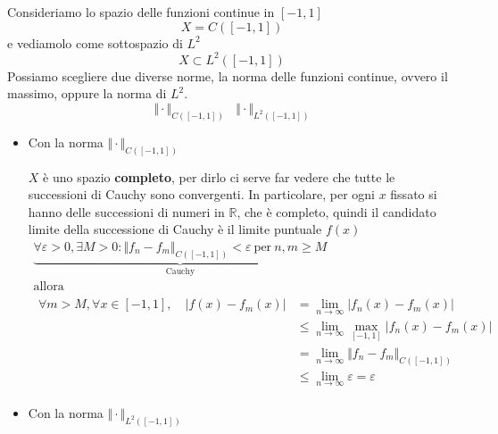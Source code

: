 Consideriamo lo spazio delle funzioni continue in $\displaystyle [ -1,1]$
\begin{equation*}
    X=C([ -1,1])
\end{equation*}
e vediamolo come sottospazio di $\displaystyle L^{2}$
\begin{equation*}
    X\subset L^{2}([ -1,1])
\end{equation*}
Possiamo scegliere due diverse norme, la norma delle funzioni continue, ovvero il massimo, oppure la norma di $\displaystyle L^{2}$.
\begin{equation*}
    \Vert \cdotp \Vert _{C([ -1,1])} \ \ \ \ \Vert \cdotp \Vert _{L^{2}([ -1,1])}
\end{equation*}
\begin{itemize}
    \item Con la norma $\displaystyle \Vert \cdotp \Vert _{C([ -1,1])}$

          $X$ è uno spazio \textbf{completo}, per dirlo ci serve far vedere che tutte le successioni di Cauchy sono convergenti. In particolare, per ogni $x$ fissato si hanno delle successioni di numeri in $\displaystyle \mathbb{R}$, che è completo, quindi il candidato limite della successione di Cauchy è il limite puntuale $\displaystyle f(x)$
          \begin{gather*}
              \underbrace{\forall \varepsilon  >0,\exists M >0:\Vert f_{n} -f_{m}\Vert _{C([ -1,1])} < \varepsilon \ \text{per} \ n,m\geq M}_{\text{Cauchy}}\\
              \text{allora}\\
              \begin{aligned}
                  \forall m >M,\forall x\in [ -1,1],\quad |f(x) -f_{m}(x) | & =\lim _{n\rightarrow \infty } |f_{n}(x) -f_{m}(x) |                        \\
                                                                            & \leq \lim _{n\rightarrow \infty }\max_{[ -1,1]} |f_{n}(x) -f_{m}(x) | \\
                                                                            & =\lim _{n\rightarrow \infty }\Vert f_{n} -f_{m}\Vert _{C([ -1,1])}         \\
                                                                            & \leq \lim _{n\rightarrow \infty } \varepsilon =\varepsilon
              \end{aligned}
          \end{gather*}
    \item Con la norma $\displaystyle \Vert \cdotp \Vert _{L^{2}([ -1,1])}$


\end{itemize}
